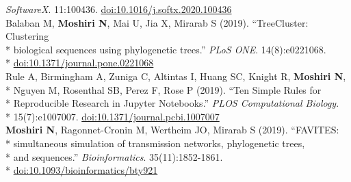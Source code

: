 \documentclass[margin,line]{res}
\begin{document}
\begin{resume}
\hspace*{8mm} \textit{SoftwareX}. 11:100436. \href{https://doi.org/10.1016/j.softx.2020.100436}{doi:10.1016/j.softx.2020.100436}\\
\hspace*{4mm} Balaban M, \textbf{Moshiri N}, Mai U, Jia X, Mirarab S (2019). ``TreeCluster: Clustering\\*
\hspace*{9.5mm} biological sequences using phylogenetic trees.'' \textit{PLoS ONE}. 14(8):e0221068.\\*\vspace{2mm}
\hspace*{8mm} \href{https://doi.org/10.1371/journal.pone.0221068}{doi:10.1371/journal.pone.0221068}\\
\hspace*{4mm} Rule A, Birmingham A, Zuniga C, Altintas I, Huang SC, Knight R, \textbf{Moshiri N},\\*
\hspace*{9.5mm} Nguyen M, Rosenthal SB, Perez F, Rose P (2019). ``Ten Simple Rules for\\*
\hspace*{9.5mm} Reproducible Research in Jupyter Notebooks.'' \textit{PLOS Computational Biology}.\\*\vspace{2mm}
\hspace*{8mm} 15(7):e1007007. \href{https://doi.org/10.1371/journal.pcbi.1007007}{doi:10.1371/journal.pcbi.1007007}\\
\hspace*{4mm} \textbf{Moshiri N}, Ragonnet-Cronin M, Wertheim JO, Mirarab S (2019). ``FAVITES:\\*
\hspace*{9.5mm} simultaneous simulation of transmission networks, phylogenetic trees,\\*
\hspace*{9.5mm} and sequences.'' \textit{Bioinformatics}. 35(11):1852-1861.\\*\vspace{2mm}
\hspace*{8mm} \href{https://doi.org/10.1093/bioinformatics/bty921}{doi:10.1093/bioinformatics/bty921}\\

\end{resume}
\end{document}
